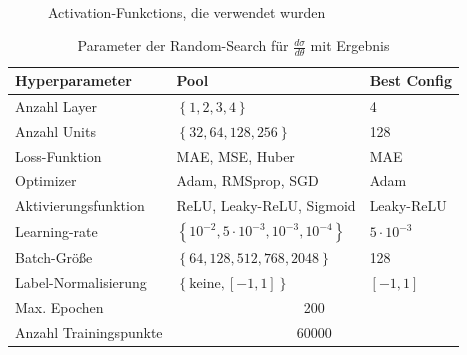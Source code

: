 \begin{figure}[tbp]
	 \\  
	\caption{Activation-Funkctions, die verwendet wurden}
	\label{11,27,28}
\end{figure}
\begin{table}
	\centering
	\begin{tabular}{|l|l|l|}
		\hline
		Hyperparameter & Pool & Best Config \\
		\hline
		Anzahl Layer & $\left\lbrace 1, 2, 3, 4 \right\rbrace$ & 4 \\
		Anzahl Units & $\left\lbrace 32, 64, 128, 256\right\rbrace$ & 128 \\
		Loss-Funktion & MAE, MSE, Huber & MAE \\
		Optimizer & Adam, RMSprop, SGD  & Adam\\
		Aktivierungsfunktion & ReLU, Leaky-ReLU, Sigmoid & Leaky-ReLU \\
		Learning-rate & $\left\lbrace 10^{-2}, 5 \cdot 10^{-3}, 10^{-3}, 10^{-4} \right\rbrace $ & $5 \cdot 10^{-3}$\\
		Batch-Größe & $\left\lbrace 64, 128, 512, 768, 2048 \right\rbrace $ & 128\\
		Label-Normalisierung & $\left\lbrace \text{keine}, [-1,1]\right\rbrace $ & $[-1,1]$\\
		\hline
		Max. Epochen & \multicolumn{2}{c|}{200}\\
		Anzahl Trainingspunkte & \multicolumn{2}{c|}{60000} \\
		\hline
	\end{tabular}
	\caption{Parameter der Random-Search für $\frac{d\sigma}{d\theta}$ mit Ergebnis}
\end{table}
